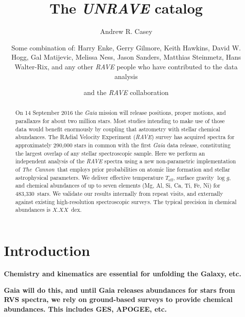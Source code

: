 \documentclass[preprint2,trackchanges]{aastex}
\newcommand{\project}[1]{\textsl{#1}}
\newcommand{\thecannon}{\project{The~Cannon}}
\newcommand{\logg}{\log g}
\newcommand{\teff}{T_{\mathrm{eff}}}
\newcommand{\stub}[1]{\textbf{#1}}
\newcommand{\Nstars}{483,330}
\begin{document}
\title{The \project{UNRAVE} catalog}

\author{Andrew R. Casey}

\author{Some combination of: Harry Enke, Gerry Gilmore, Keith Hawkins, David W. Hogg, Gal Matijevic, Melissa Ness, Jason Sanders, Matthias Steinmetz, Hans Walter-Rix, and any other \project{RAVE} people who have contributed to the data analysis}

\author{and the \project{RAVE} collaboration}

\begin{abstract}
On 14 September 2016 the \project{Gaia} mission will release positions, proper 
motions, and parallaxes for about two million stars.  Most studies intending to
make use of those data would benefit enormously by coupling that astrometry with
stellar chemical abundances.  The RAdial Velocity Experiment (\project{RAVE}) 
survey has acquired spectra for approximately 290,000 stars in common with the 
first \project{Gaia} data release, constituting the largest overlap of any 
stellar spectroscopic sample.  Here we perform an independent analysis of the 
\project{RAVE} spectra using a new non-parametric implementation of \thecannon\ 
that employs prior probabilities on atomic line formation and stellar 
astrophysical parameters.  We deliver effective temperature $\teff$, surface 
gravity $\logg$, and chemical abundances of up to seven elements (Mg, Al, Si, 
Ca, Ti, Fe, Ni) for \Nstars\ stars.  We validate our results internally from 
repeat visits, and externally against existing high-resolution spectroscopic 
surveys.  The typical precision in chemical abundances is $X.XX$~dex.  
\end{abstract}

\keywords{}

\section{Introduction} 
\label{sec:introduction}

\stub{Chemistry and kinematics are essential for unfolding the Galaxy, etc.}

\stub{
Gaia will do this, and until Gaia releases abundances for stars from RVS 
spectra, we rely on ground-based surveys to provide chemical abundances.
This includes GES, APOGEE, etc.
}
\end{document}
